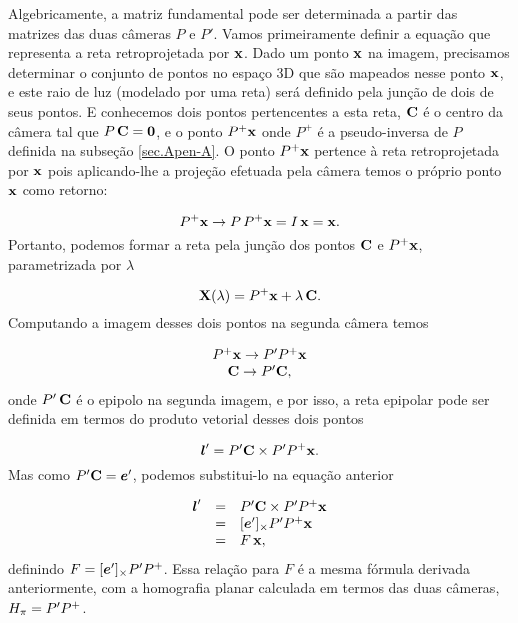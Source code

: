 Algebricamente, a matriz fundamental pode ser determinada a partir das matrizes das duas câmeras $P$ e $P'$. Vamos primeiramente definir a equação que representa a reta retroprojetada por $\mathbf{x}$. Dado um ponto $\mathbf{x}$ na imagem, precisamos determinar o conjunto de pontos no espaço 3D que são mapeados nesse ponto $\mathbf{x}$, e este raio de luz (modelado por uma reta) será definido pela junção de dois de seus pontos. E conhecemos dois pontos pertencentes a esta reta, ${\bf C}$ é o centro da câmera tal que $P\,{\bf C}={\bf 0}$, e o ponto $P^+\mathbf{x}$ onde $P^+$ é a pseudo-inversa de $P$ definida na subseção \ref{sec.Apen-A}. O ponto $P^+\mathbf{x}$ pertence à reta retroprojetada por $\mathbf{x}$ pois aplicando-lhe a projeção efetuada pela câmera temos o próprio ponto $\mathbf{x}$ como retorno:

\begin{equation*}
P^+\mathbf{x} \rightarrow P\,P^+\mathbf{x}=I\,\mathbf{x}=\mathbf{x}.
\end{equation*}
Portanto, podemos formar a reta pela junção dos pontos ${\bf C}$ e $P^+\mathbf{x}$, parametrizada por $\lambda$

\begin{equation*}
\mathbf{X}(\lambda)=P^+\mathbf{x}+\lambda\,{\bf C}.
\end{equation*}
Computando a imagem desses dois pontos na segunda câmera temos

\begin{equation*}
\begin{array}{c}
P^+\mathbf{x} \rightarrow P'P^+\mathbf{x}\\
{\bf C} \rightarrow P'{\bf C},
\end{array}
\end{equation*}
onde $P'\,{\bf C}$ é o epipolo na segunda imagem, e por isso, a reta epipolar pode ser definida em termos do produto vetorial desses dois pontos

\begin{equation}\label{eq.reta-epipolar-funcao-cameras}
\boldsymbol{l}'=P'{\bf C} \times P'P^+\mathbf{x}.
\end{equation}
Mas como $P'{\bf C}=\boldsymbol{e}'$, podemos substitui-lo na equação anterior

\begin{equation*}
\begin{array}{rcl}
\boldsymbol{l}'&=&P'{\bf C} \times P'P^+\mathbf{x}\\
&=&[\boldsymbol{e}']_\times P'P^+\mathbf{x}\\
&=&F\,\mathbf{x},
\end{array}
\end{equation*}
definindo $F=[\boldsymbol{e}']_\times P'P^+$. Essa relação para $F$ é a mesma fórmula derivada anteriormente, com a homografia planar calculada em termos das duas câmeras, $H_{\pi}=P'P^+$.

